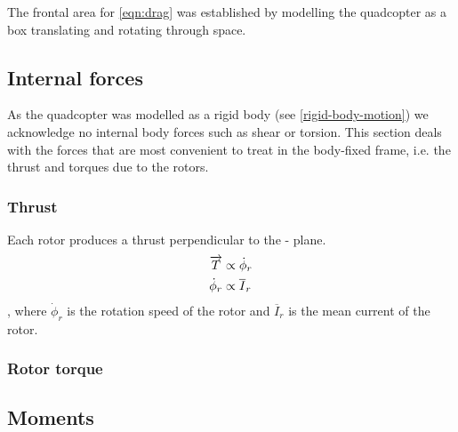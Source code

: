 The frontal area for \cref{eqn:drag} was established by modelling the quadcopter as a box translating and rotating through space.
\subsection{Internal forces}
As the quadcopter was modelled as a rigid body (see \cref{rigid-body-motion}) we acknowledge no internal body forces such as shear or torsion. This section deals with the forces that are most convenient to treat in the body-fixed frame, i.e. the thrust and torques due to the rotors.
\subsubsection[Thrust]{Thrust  }
Each rotor produces a thrust perpendicular to the - plane.
\begin{align*}
\overrightarrow T &\propto \dot\phi_r\\
\dot{\phi}_r &\propto \overline{I}_r
\end{align*}
, where $\dot{\phi}_r$ is the rotation speed of the rotor and $\overline{I}_r$ is the mean current of the rotor.

\subsubsection[Rotor torque]{Rotor torque}

\subsection{Moments}

